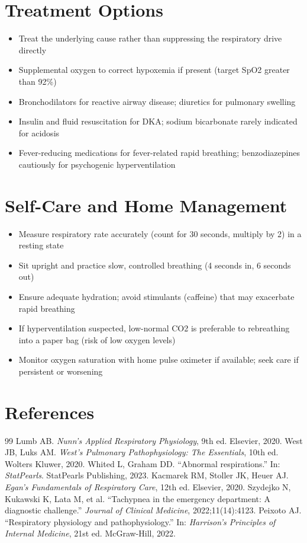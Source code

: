 \section*{Treatment Options}
\begin{itemize}
  \item Treat the underlying cause rather than suppressing the respiratory drive directly
  \item Supplemental oxygen to correct hypoxemia if present (target SpO2 greater than 92\%)
  \item Bronchodilators for reactive airway disease; diuretics for pulmonary swelling
  \item Insulin and fluid resuscitation for DKA; sodium bicarbonate rarely indicated for acidosis
  \item Fever-reducing medications for fever-related rapid breathing; benzodiazepines cautiously for psychogenic hyperventilation
\end{itemize}

\section*{Self-Care and Home Management}
\begin{itemize}
  \item Measure respiratory rate accurately (count for 30 seconds, multiply by 2) in a resting state
  \item Sit upright and practice slow, controlled breathing (4 seconds in, 6 seconds out)
  \item Ensure adequate hydration; avoid stimulants (caffeine) that may exacerbate rapid breathing
  \item If hyperventilation suspected, low-normal CO2 is preferable to rebreathing into a paper bag (risk of low oxygen levels)
  \item Monitor oxygen saturation with home pulse oximeter if available; seek care if persistent or worsening
\end{itemize}

\section*{References}
\begin{thebibliography}{99}
 Lumb AB. \textit{Nunn's Applied Respiratory Physiology}, 9th ed. Elsevier, 2020.
 West JB, Luks AM. \textit{West's Pulmonary Pathophysiology: The Essentials}, 10th ed. Wolters Kluwer, 2020.
 Whited L, Graham DD. ``Abnormal respirations.'' In: \textit{StatPearls}. StatPearls Publishing, 2023.
 Kacmarek RM, Stoller JK, Heuer AJ. \textit{Egan's Fundamentals of Respiratory Care}, 12th ed. Elsevier, 2020.
 Szydejko N, Kukawski K, Lata M, et al. ``Tachypnea in the emergency department: A diagnostic challenge.'' \textit{Journal of Clinical Medicine}, 2022;11(14):4123.
 Peixoto AJ. ``Respiratory physiology and pathophysiology.'' In: \textit{Harrison's Principles of Internal Medicine}, 21st ed. McGraw-Hill, 2022.
\end{thebibliography}

